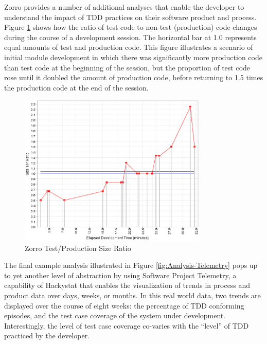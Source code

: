 \documentclass[11pt,twocolumn]{article}
\begin{document}
Zorro provides a number of additional analyses that enable the developer to
understand the impact of TDD practices on their software product and
process.  Figure \ref{fig:Analysis-Ratio} shows how the ratio of test code
to non-test (production) code changes during the course of a development
session.  The horizontal bar at 1.0 represents equal amounts of test and
production code.  This figure illustrates a scenario of initial module
development in which there was significantly more production code than test
code at the beginning of the session, but the proportion of test code rose
until it doubled the amount of production code, before returning to 1.5
times the production code at the end of the session.

\begin{figure}[th]
  \center
  \includegraphics[width=0.80\textwidth]{zorro-test-production-size-ratio.eps}
  \caption{Zorro Test/Production Size Ratio}
  \label{fig:Analysis-Ratio}
\end{figure} 

The final example analysis illustrated in Figure
\ref{fig:Analysis-Telemetry} pops up to yet another level of abstraction by
using Software Project Telemetry, a capability of Hackystat that enables
the visualization of trends in process and product data over days, weeks,
or months.  In this real world data, two trends are displayed over the
course of eight weeks: the percentage of TDD conforming episodes, and the
test case coverage of the system under development.  Interestingly, the
level of test case coverage co-varies with the ``level'' of TDD practiced
by the developer.
\end{document}
